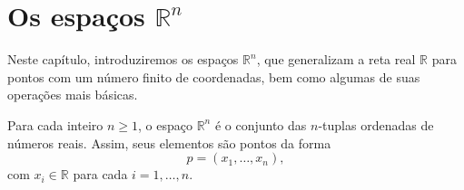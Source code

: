 \chapter{Os espaços \texorpdfstring{$\mathbb R^n$}{Rn}}

Neste capítulo, introduziremos os espaços $\mathbb R^n$, que generalizam a reta real $\mathbb R$ para pontos com um número finito de coordenadas, bem como algumas de suas operações mais básicas.

Para cada inteiro $n\geq 1$, o espaço $\mathbb R^n$ é o conjunto das $n$-tuplas ordenadas de números reais. Assim, seus elementos são pontos da forma
\[
    p=(x_1,\dots,x_n),
\]
com $x_i\in\mathbb R$ para cada $i=1,\dots,n$.





